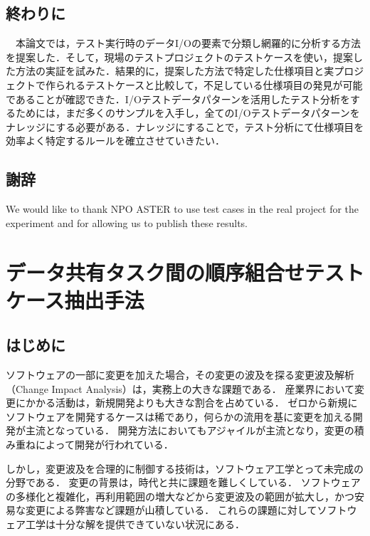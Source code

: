 \documentclass[a4paper,11pt]{jreport}
\begin{document}
\section{終わりに}
　本論文では，テスト実行時のデータI/Oの要素で分類し網羅的に分析する方法を提案した．そして，現場のテストプロジェクトのテストケースを使い，提案した方法の実証を試みた．結果的に，提案した方法で特定した仕様項目と実プロジェクトで作られるテストケースと比較して，不足している仕様項目の発見が可能であることが確認できた．I/Oテストデータパターンを活用したテスト分析をするためには，まだ多くのサンプルを入手し，全てのI/Oテストデータパターンをナレッジにする必要がある．ナレッジにすることで，テスト分析にて仕様項目を効率よく特定するルールを確立させていきたい．

\section{謝辞}
We would like to thank NPO ASTER to use test cases in the real project for the experiment and for allowing us to publish these results.



\chapter{データ共有タスク間の順序組合せテストケース抽出手法}

\section{はじめに}
ソフトウェアの一部に変更を加えた場合，その変更の波及を探る変更波及解析（Change Impact Analysis）は，実務上の大きな課題である．
産業界において変更にかかる活動は，新規開発よりも大きな割合を占めている．
ゼロから新規にソフトウェアを開発するケースは稀であり，何らかの流用を基に変更を加える開発が主流となっている．
開発方法においてもアジャイルが主流となり，変更の積み重ねによって開発が行われている．

しかし，変更波及を合理的に制御する技術は，ソフトウェア工学とって未完成の分野である\cite{arnold1996software}．
変更の背景は，時代と共に課題を難しくしている．
ソフトウェアの多様化と複雑化，再利用範囲の増大などから変更波及の範囲が拡大し，かつ安易な変更による弊害など課題が山積している．
これらの課題に対してソフトウェア工学は十分な解を提供できていない状況にある\cite{li2013survey}．
\end{document}
